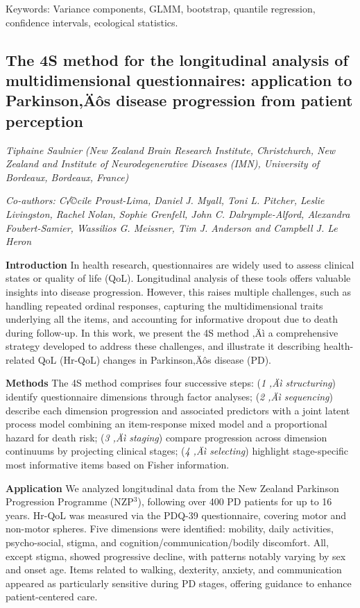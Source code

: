 \documentclass[
]{scrreprt}
\begin{document}
Keywords: Variance components, GLMM, bootstrap, quantile regression,
confidence intervals, ecological statistics.

\subsection{The 4S method for the longitudinal analysis of
multidimensional questionnaires: application to Parkinson‚Äôs disease
progression from patient
perception}\label{the-4s-method-for-the-longitudinal-analysis-of-multidimensional-questionnaires-application-to-parkinsonuxe4uxf4s-disease-progression-from-patient-perception}

\emph{Tiphaine Saulnier} \emph{(New Zealand
Brain Research Institute, Christchurch, New Zealand and Institute of
Neurodegenerative Diseases (IMN), University of Bordeaux, Bordeaux,
France)}

\emph{Co-authors: C√©cile Proust-Lima, Daniel J. Myall, Toni L. Pitcher,
Leslie Livingston, Rachel Nolan, Sophie Grenfell, John C.
Dalrymple-Alford, Alexandra Foubert-Samier, Wassilios G. Meissner, Tim
J. Anderson and Campbell J. Le Heron}

\setlength{\parskip}{0.5em}

\textbf{Introduction} In health research, questionnaires are widely used
to assess clinical states or quality of life (QoL). Longitudinal
analysis of these tools offers valuable insights into disease
progression. However, this raises multiple challenges, such as handling
repeated ordinal responses, capturing the multidimensional traits
underlying all the items, and accounting for informative dropout due to
death during follow-up. In this work, we present the 4S method ‚Äì a
comprehensive strategy developed to address these challenges, and
illustrate it describing health-related QoL (Hr-QoL) changes in
Parkinson‚Äôs disease (PD).

\textbf{Methods} The 4S method comprises four successive steps: (\emph{1
‚Äì structuring}) identify questionnaire dimensions through factor
analyses; (\emph{2 ‚Äì sequencing}) describe each dimension progression
and associated predictors with a joint latent process model combining an
item-response mixed model and a proportional hazard for death risk;
(\emph{3 ‚Äì staging}) compare progression across dimension continuums
by projecting clinical stages; (\emph{4 ‚Äì selecting}) highlight
stage-specific most informative items based on Fisher information.

\textbf{Application} We analyzed longitudinal data from the New Zealand
Parkinson Progression Programme (NZP\(^3\)), following over 400 PD
patients for up to 16 years. Hr-QoL was measured via the PDQ-39
questionnaire, covering motor and non-motor spheres. Five dimensions
were identified: mobility, daily activities, psycho-social, stigma, and
cognition/communication/bodily discomfort. All, except stigma, showed
progressive decline, with patterns notably varying by sex and onset age.
Items related to walking, dexterity, anxiety, and communication appeared
as particularly sensitive during PD stages, offering guidance to enhance
patient-centered care.
\end{document}
